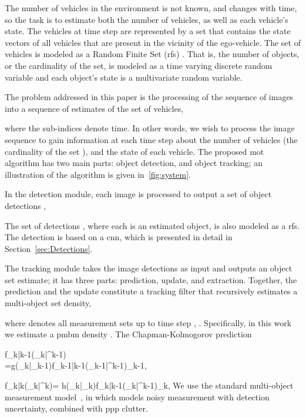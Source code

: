 \documentclass[conference]{IEEEtran}
\newcommand{\set}[1]{\boldsymbol{\mathbf{\MakeUppercase #1}}}
\newcommand{\given}[2]{#1|#2}
\begin{document}
The number of vehicles in the environment is not known, and changes with time, so the task is to estimate both the number of vehicles, as well as each vehicle's state. The vehicles at time step  are represented by a set  that contains the state vectors of all vehicles that are present in the vicinity of the ego-vehicle. The set of vehicles  is modeled as a Random Finite Set (\gls{rfs}) \cite{Mahler2007}.  That is, the number of objects, or the cardinality of the set, is modeled as a time varying discrete random variable and each object's state is a multivariate random variable.

The problem addressed in this paper is the processing of the sequence of images  into a sequence of estimates  of the set of vehicles,

where the sub-indices denote time. In other words, we wish to process the image sequence to gain information at each time step about the number of vehicles (the cardinality of the set ), and the state of each vehicle. The proposed \gls{mot} algorithm has two main parts: object detection, and object tracking; an illustration of the algorithm is given in~\cref{fig:system}.

In the detection module, each image is processed to output a set of object detections ,

The set of detections , where each   is an estimated object, is also modeled as a \gls{rfs}. The detection is based on a \gls{cnn}, which is presented in detail in Section~\ref{sec:Detections}.

The tracking module takes the image detections as input and outputs an object set estimate; it has three parts: prediction, update, and extraction. Together, the prediction and the update constitute a tracking filter that recursively estimates a multi-object set density,

where  denotes all measurement sets up to time step , . Specifically, in this work we estimate a \gls{pmbm} density \cite{Williams2015}. The Chapman-Kolmogorov prediction

      f_{\given{k}{k-1}}(\given{\set{X}_k}{\set{Z}^{k-1}}) \\
      =\int g(\given{\set{X}_k}{\set{X}_{k-1}})f_{\given{k-1}{k-1}}(\given{\set{X}_{k-1}}{\set{Z}^{k-1}})\delta\set{X}_{k-1},
    
    f_{\given{k}{k}}(\given{\set{X}_k}{\set{Z}^k})=
    \frac{h(\given{\set{Z}_k}{\set{X}_k})f_{\given{k}{k-1}}(\given{\set{X}_k}{\set{Z}^{k-1}})}
    {\int h(\given{\set{Z}_k}{\set{X}_k})f_{\given{k}{k-1}}(\given{\set{X}_k}{\set{Z}^{k-1})\delta\set{X}_k}},
  We use the standard multi-object measurement model~\cite{Mahler2007}, in which  models noisy measurement with detection uncertainty, combined with \gls{ppp} clutter.
\end{document}
